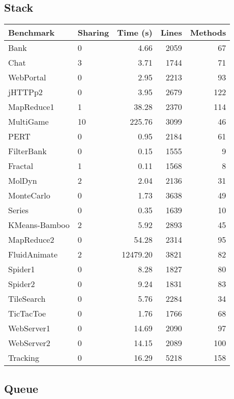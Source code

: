 \documentclass{amsart}[9pt]
\begin{document}
\subsection{Stack}

\begin{tabular}{|l|l|r|r|r|}
\hline
Benchmark & Sharing & Time (s) & Lines & Methods \\
\hline
Bank          & 0  & 4.66     & 2059 & 67 \\
Chat          & 3  & 3.71     & 1744 & 71 \\
WebPortal     & 0  & 2.95     & 2213 & 93 \\
jHTTPp2       & 0  & 3.95     & 2679 & 122 \\
MapReduce1    & 1  & 38.28    & 2370 & 114 \\
MultiGame     & 10 & 225.76   & 3099 & 46 \\
PERT          & 0  & 0.95     & 2184 & 61 \\
FilterBank    & 0  & 0.15     & 1555 & 9 \\
Fractal       & 1  & 0.11     & 1568 & 8 \\
MolDyn        & 2  & 2.04     & 2136 & 31 \\
MonteCarlo    & 0  & 1.73     & 3638 & 49 \\
Series        & 0  & 0.35     & 1639 & 10 \\
KMeans-Bamboo & 2  & 5.92     & 2893 & 45 \\
MapReduce2    & 0  & 54.28    & 2314 & 95 \\
FluidAnimate  & 2  & 12479.20 & 3821 & 82 \\
Spider1       & 0  & 8.28     & 1827 & 80 \\
Spider2       & 0  & 9.24     & 1831 & 83 \\
TileSearch    & 0  & 5.76     & 2284 & 34 \\
TicTacToe     & 0  & 1.76     & 1766 & 68 \\
WebServer1    & 0  & 14.69    & 2090 & 97 \\
WebServer2    & 0  & 14.15    & 2089 & 100 \\
Tracking      & 0  & 16.29    & 5218 & 158 \\
\hline
\end{tabular}



\subsection{Queue}
\end{document}
